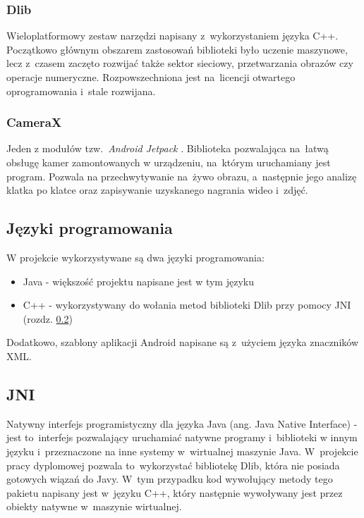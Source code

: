 \subsubsection{Dlib}

Wieloplatformowy zestaw narzędzi \cite{dlib} napisany z~wykorzystaniem języka C++. Początkowo głównym obszarem zastosowań biblioteki było uczenie maszynowe, lecz z~czasem zaczęto rozwijać także sektor sieciowy, przetwarzania obrazów czy operacje numeryczne. Rozpowszechniona jest na~licencji otwartego oprogramowania i~stale rozwijana. 

\subsubsection{CameraX}

Jeden z modułów \cite{camerax} tzw.~\textit{Android Jetpack} \cite{android_jetpack}. Biblioteka pozwalająca na~łatwą obsługę kamer zamontowanych w urządzeniu, na~którym uruchamiany jest program. Pozwala na przechwytywanie na~żywo obrazu, a~następnie jego analizę klatka po klatce oraz zapisywanie uzyskanego nagrania wideo i~zdjęć. 


\subsection{Języki programowania}

W projekcie wykorzystywane są dwa języki programowania:

\begin{itemize}
    \item Java - większość projektu napisane jest w tym języku
    \item C++ - wykorzystywany do wołania metod biblioteki Dlib przy pomocy JNI (rozdz. \ref{section:jni})
\end{itemize}

Dodatkowo, szablony aplikacji Android napisane są z~użyciem języka znaczników XML.

\subsection{JNI} \label{section:jni}

Natywny interfejs programistyczny dla języka Java (ang. Java Native Interface) \cite{jni} -  jest to~interfejs pozwalający uruchamiać natywne programy i~biblioteki w innym języku i~przeznaczone na inne systemy w~wirtualnej maszynie Java. W~projekcie pracy dyplomowej pozwala to~wykorzystać bibliotekę Dlib, która nie posiada gotowych wiązań do Javy. W~tym przypadku kod wywołujący metody tego pakietu napisany jest w~języku C++, który następnie wywoływany jest przez obiekty natywne w~maszynie wirtualnej. 